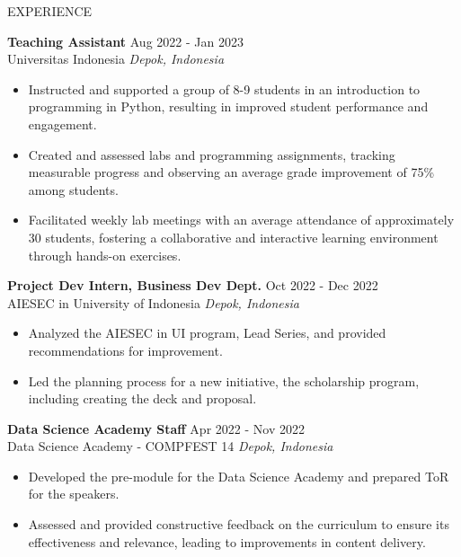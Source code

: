 \documentclass{resume} %
\begin{document}
\begin{rSection}{EXPERIENCE}

\textbf{Teaching Assistant} \hfill Aug 2022 - Jan 2023 \\
Universitas Indonesia \hfill \textit{Depok, Indonesia}
\vspace{-0.75em}
\begin{itemize}
\itemsep -7pt {}
\item Instructed and supported a group of 8-9 students in an introduction to programming in Python, resulting in improved student performance and engagement.
\item Created and assessed labs and programming assignments, tracking measurable progress and observing an average grade improvement of 75\% among students.
\item Facilitated weekly lab meetings with an average attendance of approximately 30 students, fostering a collaborative and interactive learning environment through hands-on exercises.
 \end{itemize}
 \vspace{-0.25em}

\textbf{Project Dev Intern, Business Dev Dept.} \hfill Oct 2022 - Dec 2022 \\
AIESEC in University of Indonesia \hfill \textit{Depok, Indonesia}
\vspace{-0.75em}
\begin{itemize}
\itemsep -7pt {}
\item Analyzed the AIESEC in UI program, Lead Series, and provided recommendations for improvement.
\item Led the planning process for a new initiative, the scholarship program, including creating the deck and proposal.
 \end{itemize}
 \vspace{-0.25em}

\textbf{Data Science Academy Staff} \hfill Apr 2022 - Nov 2022 \\
Data Science Academy - COMPFEST 14 \hfill \textit{Depok, Indonesia}
\vspace{-0.75em}
\begin{itemize}
\itemsep -7pt {}
\item Developed the pre-module for the Data Science Academy and prepared ToR for the speakers.
\item Assessed and provided constructive feedback on the curriculum to ensure its effectiveness and relevance, leading to improvements in content delivery.
 \end{itemize}
 \vspace{-0.25em}


\end{rSection} 
\end{document}
